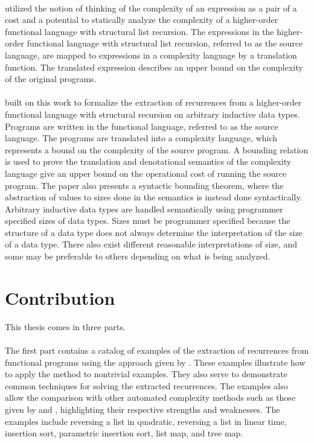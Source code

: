 \paragraph{}
\citet{Danner2013} utilized the notion of thinking of the complexity of an
expression as a pair of a cost and a potential to statically analyze the
complexity of a higher-order functional language with structural list
recursion.  The expressions in the higher-order functional language with
structural list recursion, referred to as the source language, are mapped to
expressions in a complexity language by a translation function.  The translated
expression describes an upper bound on the complexity of the original programs.

\paragraph{}
\citet{Danner2015} built on this work to formalize the extraction
of recurrences from a higher-order functional language with structural
recursion on arbitrary inductive data types. Programs are written in the
functional language, referred to as the source language. The programs are
translated into a complexity language, which represents a bound on the
complexity of the source program. A bounding relation is used to prove the
translation and denotational semantics of the complexity language give an upper
bound on the operational cost of running the source program. The paper also
presents a syntactic bounding theorem, where the abstraction of values to sizes
done in the semantics is instead done syntactically. Arbitrary inductive data
types are handled semantically using programmer specified sizes of data types.
Sizes must be programmer specified because the structure of a data type does
not always determine the interpretation of the size of a data type. There also
exist different reasonable interpretations of size, and some may be
preferable to others depending on what is being analyzed.


\section{Contribution}

This thesis comes in three parts.
\paragraph{}
The first part contains a catalog of examples of the extraction of recurrences
from functional programs using the approach given by \citet{Danner2015}. These
examples illustrate how to apply the method to nontrivial examples. They also
serve to demonstrate common techniques for solving the extracted recurrences.
The examples also allow the comparison with other automated complexity methods
such as those given by \citet{Avanzini2015} and \citet{HoffHof2010},
highlighting their respective strengths and weaknesses. The examples include
reversing a list in quadratic, reversing a list in linear time, insertion sort,
parametric insertion sort, list map, and tree map.


